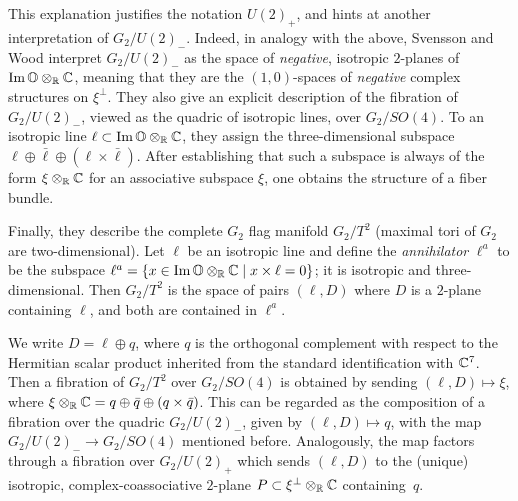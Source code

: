 This explanation justifies the notation $U(2)_+$, and hints at another interpretation of $G_2/U(2)_-$. Indeed, in analogy with the above, Svensson and Wood interpret $G_2/U(2)_-$ as the space of \emph{negative}, isotropic $2$-planes of $\operatorname{Im}\mathbb{O}\otimes_{\mathbb{R}}\mathbb{C}$, meaning that they are the $(1,0)$-spaces of \emph{negative} complex structures on $\xi^\perp$. They also give an explicit description of the fibration of $G_2/U(2)_-$, viewed as the quadric of isotropic lines, over $G_2/SO(4)$. To an isotropic line $\ell\subset \operatorname{Im}\mathbb{O}\otimes_{\mathbb{R}}\mathbb{C}$, they assign the three-dimensional subspace $\ell\oplus\bar\ell\oplus(\ell\times\bar\ell)$. After establishing that such a subspace is always of the form $\xi\otimes_{\mathbb{R}}\mathbb{C}$ for an associative subspace $\xi$, one obtains the structure of a fiber bundle.

Finally, they describe the complete $G_2$ flag manifold $G_2/T^2$ (maximal tori of $G_2$ are two-dimensional). Let $\ell$ be an isotropic line and define the \emph{annihilator} $\ell^a$ to be the subspace $\ell^a=\{x\in \operatorname{Im}\mathbb{O}\otimes_{\mathbb{R}}\mathbb{C}\mid x\times \ell=0\}$; it is isotropic and three-dimensional. Then $G_2/T^2$ is the space of pairs $(\ell,D)$ where $D$ is a $2$-plane containing $\ell$, and both are contained in $\ell^a$. 

We write $D=\ell\oplus q$, where $q$ is the orthogonal complement with respect to the Hermitian scalar product inherited from the standard identification with $\mathbb{C}^7$. Then a fibration of $G_2/T^2$ over $G_2/SO(4)$ is obtained by sending $(\ell,D)\mapsto \xi$, where $\xi\otimes_{\mathbb{R}}\mathbb{C}=q\oplus\bar q\oplus (q\times\bar q)$. This can be regarded as the composition of a fibration over the quadric $G_2/U(2)_-$, given by $(\ell,D)\mapsto q$, with the map $G_2/U(2)_-\to G_2/SO(4)$ mentioned before.
Analogously, the map factors through a fibration over $G_2/U(2)_+$ which sends $(\ell,D)$ to the (unique) isotropic, complex-coassociative $2$-plane $P\subset \xi^\perp\otimes_{\mathbb{R}}\mathbb{C}$ containing~$q$.

